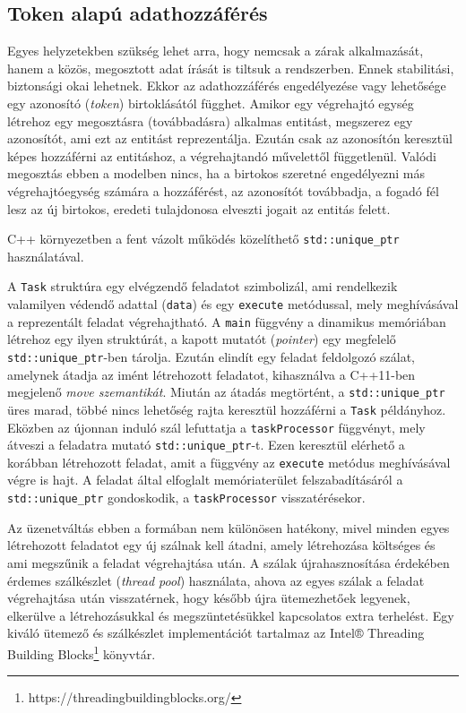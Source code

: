     \vfill
    
    \subsection{Token alapú adathozzáférés} 
    \label{seq:messagepassing}
    
    Egyes helyzetekben szükség lehet arra, hogy nemcsak a zárak alkalmazását, hanem a közös, megosztott adat írását is tiltsuk a rendszerben. Ennek stabilitási, biztonsági okai lehetnek. Ekkor az adathozzáférés engedélyezése vagy lehetősége egy azonosító (\emph{token}) birtoklásától függhet. Amikor egy végrehajtó egység létrehoz egy megosztásra (továbbadásra) alkalmas entitást, megszerez egy azonosítót, ami ezt az entitást reprezentálja. Ezután csak az azonosítón keresztül képes hozzáférni az entitáshoz, a végrehajtandó művelettől függetlenül. Valódi megosztás ebben a modelben nincs, ha a birtokos szeretné engedélyezni más végrehajtóegység számára a hozzáférést, az azonosítót továbbadja, a fogadó fél lesz az új birtokos, eredeti tulajdonosa elveszti jogait az entitás felett.
    
    C++ környezetben a fent vázolt működés közelíthető \texttt{std::unique\_ptr} használatával.
    
%
    A \texttt{Task} struktúra egy elvégzendő feladatot szimbolizál, ami rendelkezik valamilyen védendő adattal (\texttt{data}) és egy \texttt{execute} metódussal, mely meghívásával a reprezentált feladat végrehajtható. A \texttt{main} függvény a dinamikus memóriában létrehoz egy ilyen struktúrát, a kapott mutatót (\emph{pointer}) egy megfelelő \texttt{std::unique\_ptr}-ben tárolja. Ezután elindít egy feladat feldolgozó szálat, amelynek átadja az imént létrehozott feladatot, kihasználva a C++11-ben megjelenő \emph{move szemantikát}. Miután az átadás megtörtént, a \texttt{std::unique\_ptr} üres marad, többé nincs lehetőség rajta keresztül hozzáférni a \texttt{Task} példányhoz. Eközben az újonnan induló szál lefuttatja a \texttt{taskProcessor} függvényt, mely átveszi a feladatra mutató \texttt{std::unique\_ptr}-t. Ezen keresztül elérhető a korábban létrehozott feladat, amit a függvény az \texttt{execute} metódus meghívásával végre is hajt. A feladat által elfoglalt memóriaterület felszabadításáról a \texttt{std::unique\_ptr} gondoskodik, a \texttt{taskProcessor} visszatérésekor.
    
    Az üzenetváltás ebben a formában nem különösen hatékony, mivel minden egyes létrehozott feladatot egy új szálnak kell átadni, amely létrehozása költséges és ami megszűnik a feladat végrehajtása után. A szálak újrahasznosítása érdekében érdemes szálkészlet (\emph{thread pool}) használata, ahova az egyes szálak a feladat végrehajtása után visszatérnek, hogy később újra ütemezhetőek legyenek, elkerülve a létrehozásukkal és megszüntetésükkel kapcsolatos extra terhelést. Egy kiváló ütemező és szálkészlet implementációt tartalmaz az Intel® Threading Building Blocks\footnote{https://threadingbuildingblocks.org/} könyvtár.
    
